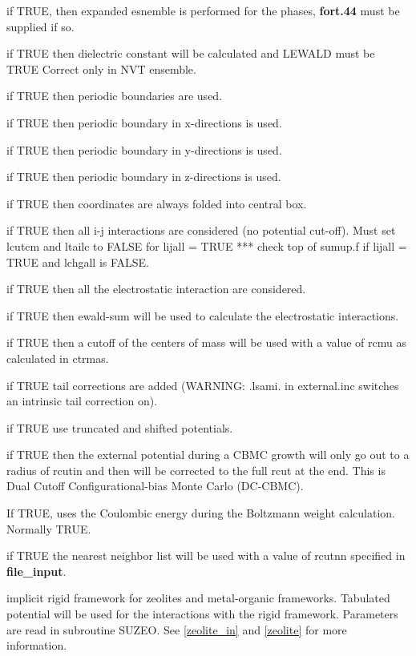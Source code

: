 \documentclass[12pt,letterpaper]{article}
\begin{document}
 if TRUE, then expanded esnemble is
performed for the phases, {\bf fort.44} must be supplied if
so.

 if TRUE then dielectric constant
will be calculated and LEWALD must be TRUE Correct only in
NVT ensemble.

 if TRUE then periodic boundaries are used.

 if TRUE then periodic boundary in x-directions is used.

 if TRUE then periodic boundary in y-directions is used.

 if TRUE then periodic boundary in z-directions is used.

 if TRUE then coordinates are always folded into central box.

 if TRUE then all i-j interactions are
considered (no potential cut-off). Must set lcutcm and
ltailc to FALSE for lijall = TRUE *** check top of sumup.f
if lijall = TRUE and lchgall is FALSE.

 if TRUE then all the electrostatic
interaction are considered.

 if TRUE then ewald-sum will be used to
calculate the electrostatic interactions.

 if TRUE then a cutoff of the centers
of mass will be used with a value of rcmu as calculated in
ctrmas.

 if TRUE tail corrections are added
(WARNING: .lsami. in external.inc switches an intrinsic tail
correction on).

 if TRUE use truncated and shifted potentials.

 if TRUE then the external potential
during a CBMC growth will only go out to a radius of rcutin
and then will be corrected to the full rcut at the end. This
is Dual Cutoff Configurational-bias Monte Carlo (DC-CBMC).

 If TRUE, uses the Coulombic
energy during the Boltzmann weight calculation. Normally
TRUE.

 if TRUE the nearest neighbor list will
be used with a value of rcutnn specified in {\bf
  file\_input}.

 implicit rigid framework for zeolites
and metal-organic frameworks. Tabulated potential will be
used for the interactions with the rigid framework.
Parameters are read in subroutine SUZEO. See
\ref{zeolite_in} and \ref{zeolite} for more information.
\end{document}

